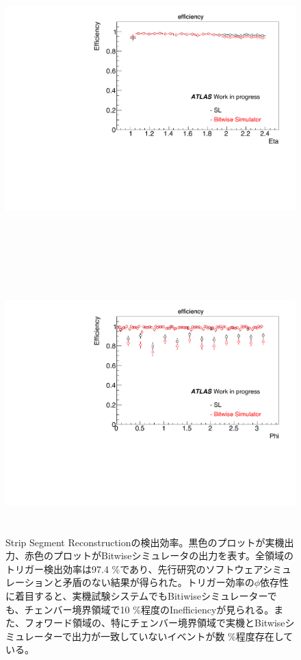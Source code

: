 \begin{figure}
\begin{minipage}[b]{\linewidth}
\centering
\includegraphics[height=10cm]{fig/Test/A_SM_strip_eta.pdf}
\end{minipage}\\
\begin{minipage}[b]{\linewidth}
\centering
\includegraphics[height=10cm]{fig/Test/A_SM_strip_phi.pdf}
\end{minipage}%
\caption[Strip Segment Reconstructionの検出効率]{Strip Segment Reconstructionの検出効率。黒色のプロットが実機出力、赤色のプロットがBitwiseシミュレータの出力を表す。全領域のトリガー検出効率は97.4 \%であり、先行研究のソフトウェアシミュレーションと矛盾のない結果が得られた。トリガー効率の$\phi$依存性に着目すると、実機試験システムでもBitiwiseシミュレーターでも、チェンバー境界領域で10 \%程度のInefficiencyが見られる。また、フォワード領域の、特にチェンバー境界領域で実機とBitwiseシミュレーターで出力が一致していないイベントが数 \%程度存在している。}
\label{SM_A_strip}
\end{figure}



